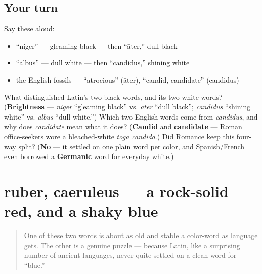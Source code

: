 \subsection*{Your turn}
Say these aloud:

\begin{itemize}
\raggedright
  \item \textquotedblleft{}niger\textquotedblright{} — gleaming black — then \textquotedblleft{}āter,\textquotedblright{} dull black
  \item \textquotedblleft{}albus\textquotedblright{} — dull white — then \textquotedblleft{}candidus,\textquotedblright{} shining white
  \item the English fossils — \textquotedblleft{}atrocious\textquotedblright{} (āter), \textquotedblleft{}candid, candidate\textquotedblright{} (candidus)
\end{itemize}

\begin{tcolorbox}[breakable,colback=teal!4,colframe=teal!35!black,title={Before you move on}]
What distinguished Latin's two black words, and its two white words? (\textbf{Brightness} — \emph{niger} \textquotedblleft{}gleaming black\textquotedblright{} vs. \emph{āter} \textquotedblleft{}dull black\textquotedblright{}; \emph{candidus} \textquotedblleft{}shining white\textquotedblright{} vs. \emph{albus} \textquotedblleft{}dull white.\textquotedblright{}) Which two English words come from \emph{candidus}, and why does \emph{candidate} mean what it does? (\textbf{Candid} and \textbf{candidate} — Roman office-seekers wore a bleached-white \emph{toga candida}.) Did Romance keep this four-way split? (\textbf{No} — it settled on one plain word per color, and Spanish/French even borrowed a \textbf{Germanic} word for everyday white.)
\end{tcolorbox}
\section[ruber, caeruleus]{ruber, caeruleus — a rock-solid red, and a shaky blue}

\label{lesson:LA-C06-ruber-caeruleus}



\begin{quote}
One of these two words is about as old and stable a color-word as language gets. The other is a genuine puzzle — because Latin, like a surprising number of ancient languages, never quite settled on a clean word for \textquotedblleft{}blue.\textquotedblright{}
\end{quote}

